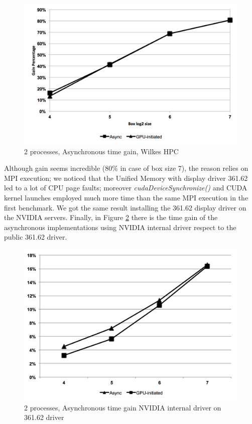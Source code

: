 \documentclass[conference]{IEEEtran}
\begin{document}
\begin{figure}[h]
\includegraphics[scale=0.5]{gain_wilkes.png}
\caption{2 processes, Asynchronous time gain, Wilkes HPC}
\label{fig:gain_wilkes}
\end{figure}

Although gain seems incredible (80\% in case of box size 7), the reason relies on MPI execution; we noticed that the Unified Memory with display driver 361.62 led to a lot of CPU page faults; moreover \textit{cudaDeviceSynchronize()} and CUDA kernel launches employed much more time than the same MPI execution in the first benchmark. We got the same result installing the 361.62 display driver on the NVIDIA servers.
Finally, in Figure \ref{fig:gain_driver} there is the time gain of the asynchronous implementations using NVIDIA internal driver respect to the public 361.62 driver.\\

\begin{figure}[h]
\includegraphics[scale=0.5]{gain_driver.png}
\caption{2 processes, Asynchronous time gain NVIDIA internal driver on 361.62 driver}
\label{fig:gain_driver}
\end{figure}
\end{document}
